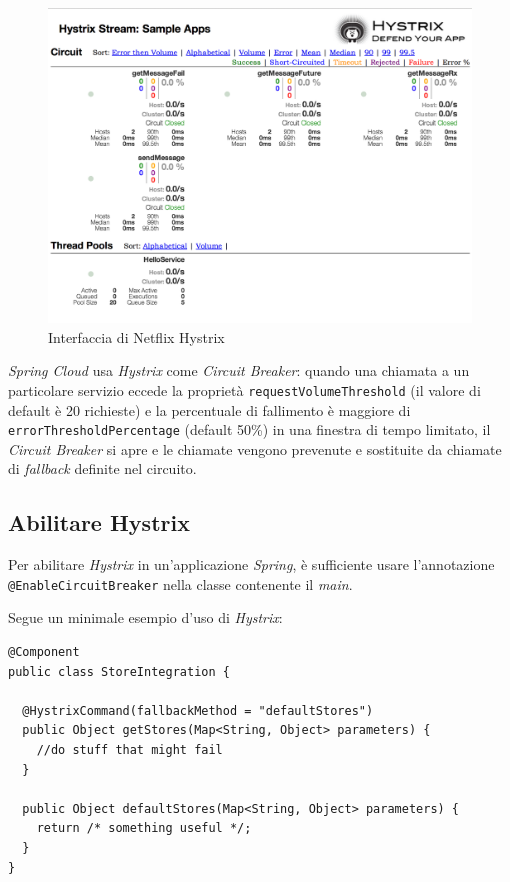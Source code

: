 \begin{figure}[H]
	\centering
	\includegraphics[width=\textwidth]{immagini/Hystrix.png}
	\caption[Interfaccia di Netflix Hystrix]{Interfaccia di Netflix Hystrix\footnotemark}
	\label{netflix-hystrix}
\end{figure}

\textit{Spring Cloud} usa \textit{Hystrix} come \textit{Circuit Breaker}:
quando una chiamata a un particolare servizio eccede la proprietà \texttt{requestVolumeThreshold} (il valore di default è 20 richieste) e la percentuale di fallimento è maggiore di \texttt{errorThresholdPercentage} (default 50\%) in una finestra di tempo limitato,
il \textit{Circuit Breaker} si apre e le chiamate vengono prevenute e sostituite da chiamate di \textit{fallback} definite nel circuito.

\subsection{Abilitare Hystrix} Per abilitare \textit{Hystrix} in un'applicazione \textit{Spring},
è sufficiente usare l'annotazione \texttt{@EnableCircuitBreaker} nella classe contenente il \textit{main}.

Segue un minimale esempio d'uso di \textit{Hystrix}:


\begin{tcolorbox}
	\begin{lstlisting}
@Component
public class StoreIntegration {

  @HystrixCommand(fallbackMethod = "defaultStores")
  public Object getStores(Map<String, Object> parameters) {
    //do stuff that might fail
  }

  public Object defaultStores(Map<String, Object> parameters) {
    return /* something useful */;
  }
}
	\end{lstlisting}
\end{tcolorbox}

